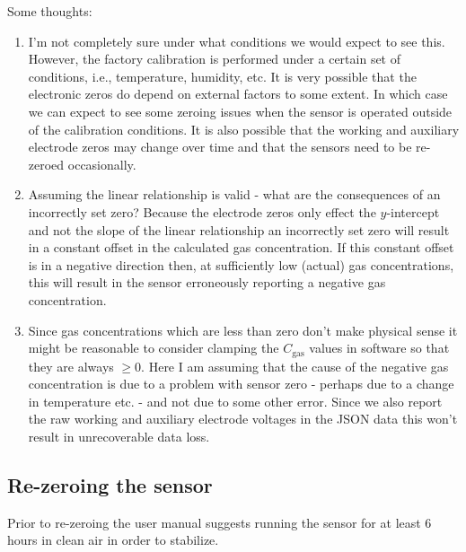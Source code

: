 \documentclass[letterpaper]{article}
\newcommand{\cgas}{C_{\mathrm{gas}}}
\begin{document}
Some thoughts:

\begin{enumerate}

    \item I'm not completely sure under what conditions we would expect to see
        this. However, the factory calibration is performed under a certain set
        of conditions, i.e., temperature, humidity, etc.  It is very possible
        that the electronic zeros do depend on external factors to some extent.
        In which case we can expect to see some zeroing issues when the sensor
        is operated outside of the calibration conditions.  It is also possible
        that the working and auxiliary electrode zeros may change over time and
        that the sensors need to be re-zeroed occasionally.

    \item Assuming the linear relationship is valid - what are the consequences
        of an incorrectly set zero?  Because the electrode zeros only effect
        the $y$-intercept and not the slope of the linear relationship an
        incorrectly set zero will result in a constant offset in the calculated
        gas concentration.  If this constant offset is in a negative direction
        then, at sufficiently low (actual) gas concentrations, this will result
        in the sensor erroneously reporting a negative gas concentration.

    \item Since gas concentrations which are less than zero don't make physical
        sense it might be reasonable to consider clamping the $\cgas$ values in
        software so that they are always $\geq 0$. Here I am assuming
        that the cause of the negative gas concentration is due to a problem
        with sensor zero - perhaps due to a change in temperature etc. - and
        not due to some other error.  Since we also report the raw 
        working and auxiliary electrode voltages in the JSON data this won't
        result in unrecoverable data loss. 

\end{enumerate}


\subsection{Re-zeroing the sensor}

Prior to re-zeroing the user manual suggests running the sensor for
at least 6 hours in clean air in order to stabilize.
\end{document}
